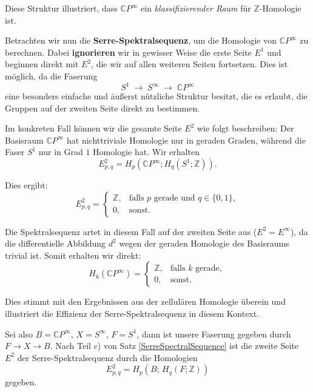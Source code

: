 \documentclass[12pt]{article}
\numberwithin{conj}{section}
\begin{document}
    Diese Struktur illustriert, dass $\mathbb{C}P^{\infty}$ ein \textit{klassifizierender Raum} für $\mathbb{Z}$-Homologie ist.

    \smallskip

    Betrachten wir nun die \textbf{Serre-Spektralsequenz}, um die Homologie von $\mathbb{C}
    P^{\infty}$ zu berechnen. Dabei \textbf{ignorieren} wir in gewisser Weise die erste
    Seite $E^{1}$ und beginnen direkt mit $E^{2}$, die wir auf allen weiteren
    Seiten fortsetzen. Dies ist möglich, da die Faserung
    \[
        S^{1} \;\longrightarrow\; S^{\infty} \;\longrightarrow\; \mathbb{C}P^{\infty}
    \]
    eine besonders einfache und äußerst nützliche Struktur besitzt, die es erlaubt,
    die Gruppen auf der zweiten Seite direkt zu bestimmen.

    Im konkreten Fall können wir die gesamte Seite $E^{2}$ wie folgt beschreiben: Der Basisraum $\mathbb{C}P^{\infty}$ hat nichttriviale Homologie nur in geraden Graden,
    während die Faser $S^{1}$ nur in Grad $1$ Homologie hat. Wir erhalten
    \[
        E^{2}_{p,q} = H_{p}(\mathbb{C}P^{\infty}; H_{q}(S^{1};\mathbb{Z})
        ).
    \]

    Dies ergibt:
    \[
        E^{2}_{p,q}=
        \begin{cases}
            \mathbb{Z}, & \text{falls } p \text{ gerade und } q \in \{0,1\}, \\
            0,          & \text{sonst}.
        \end{cases}
    \]

    Die Spektralsequenz artet in diesem Fall auf der zweiten Seite aus ($E^{2} =
    E^{\infty}$), da die differentielle Abbildung $d^{2}$ wegen der geraden
    Homologie des Basisraums trivial ist. Somit erhalten wir direkt:
    \[
        H_{k}(\mathbb{C}P^{\infty}) =
        \begin{cases}
            \mathbb{Z}, & \text{falls } k \text{ gerade}, \\
            0,          & \text{sonst}.
        \end{cases}
    \]

    Dies stimmt mit den Ergebnissen aus der zellulären Homologie überein und illustriert
    die Effizienz der Serre-Spektralsequenz in diesem Kontext.

    Sei also $B = \mathbb{C}P^{\infty}$, $X = S^{\infty}$, $F = S^{1}$, dann ist
    unsere Faserung gegeben durch $F \to X \to B$. Nach Teil c) von Satz
    \ref{SerreSpectralSequence} ist die zweite Seite $E^{2}$ der Serre-Spektralsequenz
    durch die Homologien
    \[
        E^{2}_{p,q}= H_{p}(B;\, H_{q}(F;\mathbb{Z}))
    \]
    gegeben.
\end{document}
